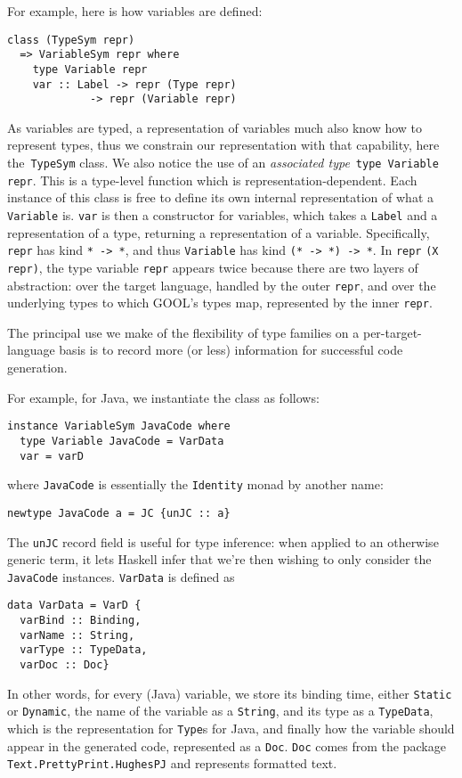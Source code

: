 \documentclass[sigplan,review,anonymous,prologue,dvipsnames]{acmart}
\begin{document}
For example, here is how variables are defined:
\begin{lstlisting}
class (TypeSym repr)
  => VariableSym repr where
    type Variable repr
    var :: Label -> repr (Type repr)
             -> repr (Variable repr)
\end{lstlisting}
As variables are typed, a representation of variables much also know how
to represent types, thus we constrain our representation with that capability,
here the~\verb|TypeSym| class.  We also notice the use of an
\emph{associated type}~\verb|type Variable repr|. This is a type-level
function which is representation-dependent.  Each instance of this class
is free to define its own internal representation of what a
\verb|Variable| is. \verb|var| is then a constructor for variables,
which takes a \verb|Label| and a representation of a type, returning
a representation of a variable.  Specifically, \verb|repr| has kind
\verb|* -> *|, and thus \verb|Variable| has kind \verb|(* -> *) -> *|.
In \verb|repr| \verb|(X repr)|, the type variable \verb|repr| appears
twice because there are two layers of abstraction: over the target
language, handled by the outer \verb|repr|, and over the underlying
types to which GOOL's types map, represented by the inner \verb|repr|.

The principal use we make of the flexibility of type families on a
per-target-language basis is to record more (or less) information for
successful code generation.  

For example, for Java, we instantiate the class as follows:
\begin{lstlisting}
instance VariableSym JavaCode where
  type Variable JavaCode = VarData
  var = varD
\end{lstlisting}
where \verb|JavaCode| is essentially the \verb|Identity| monad
by another name:
\begin{lstlisting}
newtype JavaCode a = JC {unJC :: a}
\end{lstlisting}
The \verb|unJC| record field is useful for type inference: when applied to
an otherwise generic term, it lets Haskell infer that we're then wishing
to only consider the \verb|JavaCode| instances.  \verb|VarData| is defined as
\begin{lstlisting}
data VarData = VarD {
  varBind :: Binding,
  varName :: String,
  varType :: TypeData,
  varDoc :: Doc}
\end{lstlisting}
In other words, for every (Java) variable, we store its binding time, either
\verb|Static| or \verb|Dynamic|, the name of the variable as a \verb|String|,
and its type as a \verb|TypeData|, which is the representation for
\verb|Type|s for Java, and finally how the variable should appear in the
generated code, represented as a \verb|Doc|. \verb|Doc| comes from the
package \verb|Text.PrettyPrint.HughesPJ| and represents formatted text.
\end{document}
